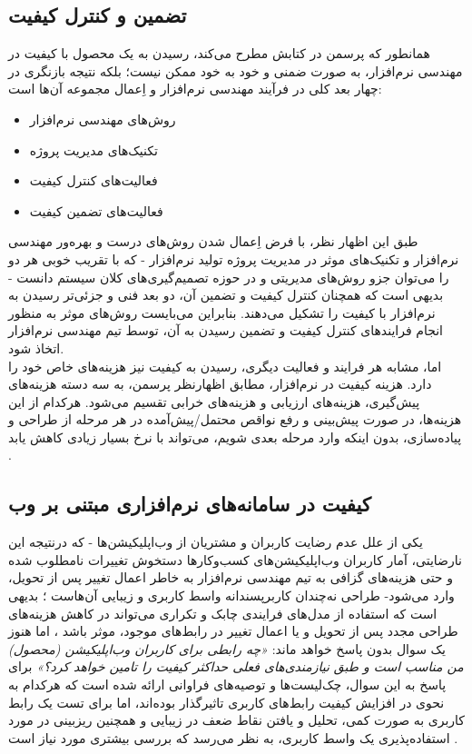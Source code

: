 \subsection{تضمین و کنترل کیفیت}
همانطور که پرسمن در کتابش
\cite{pressman_software_2015}
مطرح می‌کند، رسیدن به یک محصول با کیفیت در مهندسی نرم‌افزار، به صورت ضمنی و خود به خود ممکن نیست؛ بلکه نتیجه بازنگری در چهار بعد کلی در فرآیند مهندسی نرم‌افزار و اِعمال مجموعه آن‌ها است:
\begin{itemize}
	\item 
	روش‌های مهندسی نرم‌افزار
	\item 
	تکنیک‌های مدیریت پروژه
	\item 
	فعالیت‌های کنترل کیفیت
	\item
	فعالیت‌های تضمین کیفیت
\end{itemize}
طبق این اظهار نظر، با فرض اِعمال شدن روش‌های درست و بهره‌ور مهندسی نرم‌افزار و تکنیک‌های موثر در مدیریت پروژه تولید نرم‌افزار - که با تقریب خوبی هر دو را می‌توان جزو روش‌های مدیریتی و در حوزه تصمیم‌گیری‌های کلان سیستم دانست - بدیهی است که همچنان کنترل کیفیت و تضمین آن، دو بعد فنی و جزئی‌تر رسیدن به نرم‌افزار با کیفیت را تشکیل می‌دهند. بنابراین می‌بایست روش‌های موثر به منظور انجام فرایند‌های کنترل کیفیت و تضمین رسیدن به آن، توسط تیم مهندسی نرم‌افزار اتخاذ شود.\\
اما، مشابه هر فرایند و فعالیت دیگری، رسیدن به کیفیت نیز هزینه‌های خاص خود را دارد. هزینه کیفیت در نرم‌افزار، مطابق اظهارنظر پرسمن، به سه دسته هزینه‌های پیش‌گیری، هزینه‌های ارزیابی و هزینه‌های خرابی تقسیم می‌شود. هرکدام از این هزینه‌ها، در صورت پیش‌بینی و رفع نواقص محتمل/پیش‌آمده در هر مرحله از طراحی و پیاده‌سازی، بدون اینکه وارد مرحله بعدی شویم، می‌تواند با نرخ بسیار زیادی کاهش یابد 
\cite{pressman_software_2015}.
\subsection{کیفیت در سامانه‌های نرم‌افزاری مبتنی بر وب}
یکی از علل عدم رضایت کاربران و مشتریان از وب‌اپلیکیشن‌ها - که درنتیجه این نارضایتی، آمار کاربران وب‌اپلیکیشن‌های کسب‌وکارها دستخوش تغییرات نامطلوب شده و حتی هزینه‌های گزافی به تیم مهندسی نرم‌افزار به خاطر اعمال تغییر پس از تحویل، وارد می‌شود- طراحی نه‌چندان کاربرپسندانه واسط کاربری و زیبایی آن‌هاست 
\cite{agarwal_assessing_2002}؛
بدیهی است که استفاده از مدل‌های فرایندی چابک  و تکراری می‌تواند در کاهش هزینه‌های طراحی مجدد پس از تحویل و یا اعمال تغییر در رابط‌های موجود، موثر باشد
\cite{pressman_software_2015}،
 اما هنوز یک سوال بدون پاسخ خواهد ماند:
 \textit{«چه رابطی برای کاربران وب‌اپلیکیشن (محصول) من مناسب است و طبق نیازمندی‌های فعلی حداکثر کیفیت را تامین خواهد کرد؟»}
 برای پاسخ به این سوال، چک‌لیست‌ها و توصیه‌های فراوانی ارائه شده است
  \cite{pressman_software_2015, sommerville_software_2016}
 که هرکدام به نحوی در افزایش کیفیت رابط‌های کاربری تاثیرگذار بوده‌اند، اما برای تست یک رابط کاربری به صورت کمی، تحلیل و یافتن نقاط ضعف در زیبایی و همچنین ریزبینی در مورد استفاده‌پذیری یک واسط کاربری، به نظر می‌رسد که بررسی بیشتری مورد نیاز است
 \cite{albert_measuring_2013}.
 
